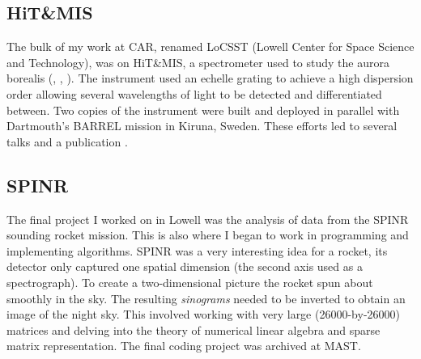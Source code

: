 \documentclass{article}
\theoremstyle{plain}
\begin{document}
        \subsection{HiT\&MIS}
            The bulk of my work at CAR, renamed LoCSST
            (Lowell Center for Space Science and Technology), was on
            HiT\&MIS, a spectrometer used to study the aurora borealis
            (\cite{2011AGUFMSA13B1890C}, \cite{2014AGUFMSA13B4000H},
            \cite{2015AGUFMSA13B2369A}). The
            instrument used an echelle grating to achieve a high dispersion
            order allowing several wavelengths of light to be detected and
            differentiated between. Two copies of the instrument were built
            and deployed in parallel with Dartmouth's BARREL mission in
            Kiruna, Sweden. These efforts led to several talks and a
            publication \cite{AryalHewawasamMaguire2018DerivationHitAndMIS}.
        \subsection{SPINR}
            The final project I worked on in Lowell was the analysis of data
            from the SPINR sounding rocket mission. This is also where I began
            to work in programming and implementing algorithms. SPINR was a very
            interesting idea for a rocket, its detector only captured one
            spatial dimension (the second axis used as a spectrograph). To
            create a two-dimensional picture the rocket spun about smoothly
            in the sky. The resulting \textit{sinograms} needed to be inverted
            to obtain an image of the night sky. This involved working with
            very large (26000-by-26000) matrices and delving into the theory of
            numerical linear algebra and sparse matrix representation. The
            final coding project was archived at MAST.
\end{document}
